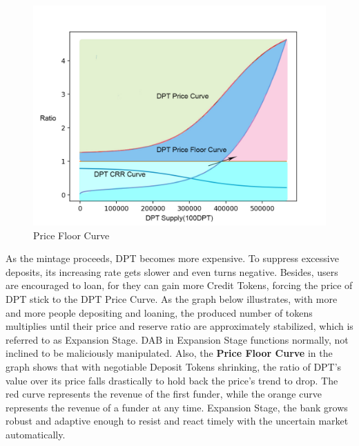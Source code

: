 \documentclass[review]{elsarticle}
\begin{document}
\begin{figure}[H]
\begin{center}
\includegraphics[width=4.5in]{Graphs/PriceFloorCurve.jpg}
\end{center}
\caption{Price Floor Curve}\label{PFC}
\end{figure}

As the mintage proceeds, DPT becomes more expensive. To suppress excessive deposits, its increasing rate gets slower and even turns negative. Besides, users are encouraged to loan, for they can gain more Credit Tokens, forcing the price of DPT stick to the DPT Price Curve. As the graph below illustrates, with more and more people depositing and loaning, the produced number of tokens multiplies until their price and reserve ratio are approximately stabilized, which is referred to as Expansion Stage. DAB in Expansion Stage functions normally, not inclined to be maliciously manipulated. Also, the \textbf{Price Floor Curve} in the graph shows that with negotiable Deposit Tokens shrinking, the ratio of DPT's value over its price falls drastically to hold back the price's trend to drop. The red curve represents the revenue of the first funder, while the orange curve represents the revenue of a funder at any time. Expansion Stage, the bank grows robust and adaptive enough to resist and react timely with the uncertain market automatically. 
\end{document}
